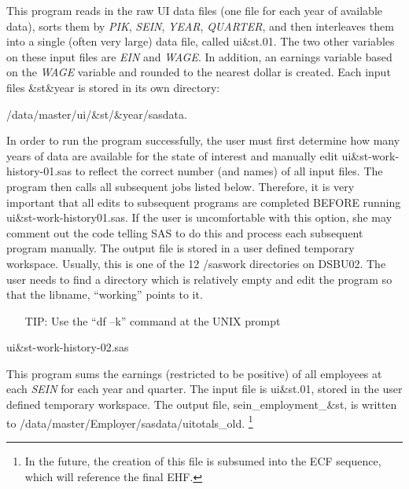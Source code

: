 \begin{description}
\begin{steps}
  This program reads in the raw UI data files (one file for each
  year of available data), sorts them by \textit{PIK},
  \textit{SEIN}, \textit{YEAR},
  \textit{QUARTER}, and then interleaves them into a single
  (often very large) data file, called ui{\&}st.01. The two other variables
  on these input files are \textit{EIN} and
  \textit{WAGE}.  In addition, an earnings variable based on
  the \textit{WAGE} variable and rounded to the nearest dollar is created.
  Each input files {\&}st{\&}year is stored in its own directory:
  \begin{center}
    /data/master/ui/{\&}st/{\&}year/sasdata.
\end{center}
In order to run the program
  successfully, the user must first determine how many years of data are
  available for the state of interest and manually edit
  ui{\&}st-work-history-01.sas to reflect the correct number (and names) of
  all input files. The program then calls all subsequent jobs listed below.
  Therefore, it is very important that all edits to subsequent programs are
  completed BEFORE running ui{\&}st-work-history01.sas. If the user is
  uncomfortable with this option, she may comment out the code telling SAS
  to do this and process each subsequent program manually. The output file
  is stored in a user defined temporary workspace. Usually, this is one of
  the 12 /saswork directories on DSBU02. The user needs to find a directory
  which is relatively empty 
  and edit the program so that the libname, ``working'' points to it.
  \begin{itemize}
  \item[TIP:] Use the ``df --k'' command at the UNIX prompt 
  \end{itemize}





\item ui{\&}st-work-history-02.sas

  
  This program sums the earnings (restricted to be positive) of all
  employees at each \textit{SEIN} for each year and quarter.
  The input file is ui{\&}st.01, stored in the user defined temporary
  workspace. The output file, sein{\_}employment{\_}{\&}st, is written to
  /data/master/Employer/sasdata/uitotals{\_}old.%
%
\footnote{In the
  future, the creation of this file is subsumed into the ECF sequence,
  which will reference the final EHF.}
%




\end{steps}
\end{description}
